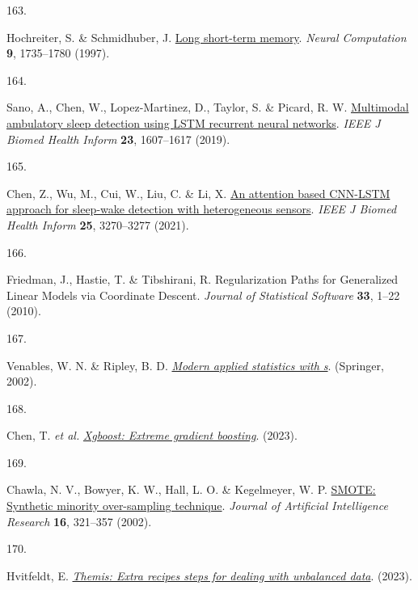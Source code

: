 \documentclass[
  10pt,
]{scrbook}
\newlength{\cslhangindent}
\newlength{\csllabelwidth}
\newlength{\cslentryspacingunit} %
\newenvironment{CSLReferences}[2] %
 {%
  \setlength{\parindent}{0pt}
  \ifodd #1
  \let\oldpar\par
  \def\par{\hangindent=\cslhangindent\oldpar}
  \fi
  \setlength{\parskip}{#2\cslentryspacingunit}
 }%
 {}
\newcommand{\CSLLeftMargin}[1]{\parbox[t]{\csllabelwidth}{#1}}
\newcommand{\CSLRightInline}[1]{\parbox[t]{\linewidth - \csllabelwidth}{#1}\break}
\let\originaltextbf\textbf
\renewcommand{\textbf}[1]{\textcolor{color1}{\textsf{\originaltextbf{#1}}}}
\begin{document}
\begin{CSLReferences}{0}{0}
\leavevmode{}%
\CSLLeftMargin{163. }%
\CSLRightInline{Hochreiter, S. \& Schmidhuber, J.
\href{https://doi.org/10.1162/neco.1997.9.8.1735}{Long short-term
memory}. \emph{Neural Computation} \textbf{9}, 1735--1780 (1997).}

\leavevmode{}%
\CSLLeftMargin{164. }%
\CSLRightInline{Sano, A., Chen, W., Lopez-Martinez, D., Taylor, S. \&
Picard, R. W.
\href{https://doi.org/10.1109/JBHI.2018.2867619}{Multimodal ambulatory
sleep detection using {LSTM} recurrent neural networks}. \emph{{IEEE} J
Biomed Health Inform} \textbf{23}, 1607--1617 (2019).}

\leavevmode{}%
\CSLLeftMargin{165. }%
\CSLRightInline{Chen, Z., Wu, M., Cui, W., Liu, C. \& Li, X.
\href{https://doi.org/10.1109/JBHI.2020.3006145}{An attention based
{CNN}-{LSTM} approach for sleep-wake detection with heterogeneous
sensors}. \emph{{IEEE} J Biomed Health Inform} \textbf{25}, 3270--3277
(2021).}

\leavevmode{}%
\CSLLeftMargin{166. }%
\CSLRightInline{Friedman, J., Hastie, T. \& Tibshirani, R.
Regularization Paths for Generalized Linear Models via Coordinate
Descent. \emph{Journal of Statistical Software} \textbf{33}, 1--22
(2010).}

\leavevmode{}%
\CSLLeftMargin{167. }%
\CSLRightInline{Venables, W. N. \& Ripley, B. D.
\emph{\href{https://www.stats.ox.ac.uk/pub/MASS4/}{Modern applied
statistics with s}}. (Springer, 2002).}

\leavevmode{}%
\CSLLeftMargin{168. }%
\CSLRightInline{Chen, T. \emph{et al.}
\emph{\href{https://CRAN.R-project.org/package=xgboost}{Xgboost: Extreme
gradient boosting}}. (2023).}

\leavevmode{}%
\CSLLeftMargin{169. }%
\CSLRightInline{Chawla, N. V., Bowyer, K. W., Hall, L. O. \& Kegelmeyer,
W. P. \href{https://doi.org/10.1613/jair.953}{{SMOTE}: Synthetic
minority over-sampling technique}. \emph{Journal of Artificial
Intelligence Research} \textbf{16}, 321--357 (2002).}

\leavevmode{}%
\CSLLeftMargin{170. }%
\CSLRightInline{Hvitfeldt, E.
\emph{\href{https://CRAN.R-project.org/package=themis}{Themis: Extra
recipes steps for dealing with unbalanced data}}. (2023).}


\end{CSLReferences}
\end{document}

